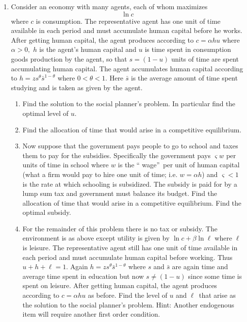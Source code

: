 \documentclass{article}
\begin{document}
\begin{enumerate}
\item Consider an economy with many agents, each of whom maximizes 
\begin{equation*}
\ln c
\end{equation*}%
where $c$ is consumption. The representative agent has one unit of time
available in each period and must accumulate human capital before he works.
After getting human capital, the agent produces according to $c=\alpha hu$
where $\alpha >0,$ $h$ is the agent's human capital and $u$ is time spent in
consumption goods production by the agent, so that $s=\left( 1-u\right) $
units of time are spent accumulating human capital. The agent accumulates
human capital according to $h=zs^{\theta }\bar{s}^{1-\theta }$ where $%
0<\theta <1.$ Here $\bar{s}$ is the average amount of time spent studying
and is taken as given by the agent.

\begin{enumerate}
\item Find the solution to the social planner's problem. In particular find
the optimal level of $u$.

\item Find the allocation of time that would arise in a competitive
equilibrium.

\item Now suppose that the government pays people to go to school and taxes
them to pay for the subsidies. Specifically the government pays $\varsigma w$
per units of time in school where $w$ is the \textquotedblleft
wage\textquotedblright\ per unit of human capital (what a firm would pay to
hire one unit of time; i.e. $w=\alpha h$) and $\varsigma <1$ is the rate at
which schooling is subsidized$.$ The subsidy is paid for by a lump sum tax
and government must balance its budget. Find the allocation of time that
would arise in a competitive equilibrium. Find the optimal subsidy.

\item For the remainder of this problem there is no tax or subsidy. The
environment is as above except utility is given by $\ln c+\beta \ln \ell $
where $\ell $ is leisure. The representative agent still has one unit of
time available in each period and must accumulate human capital before
working. Thus $u+h+\ell =1.$ Again $h=zs^{\theta }\bar{s}^{1-\theta }$ where 
$s$ and $\bar{s}$ are again time and average time spent in education but now 
$s\neq (1-u)$ since some time is spent on leisure. After getting human
capital, the agent produces according to $c=\alpha hu$ as before. Find the
level of $u$ and $\ell $\ that arise as the solution to the social planner's
problem. Hint: Another endogenous item will require another first order
condition. \pagebreak
\end{enumerate}
\end{enumerate}
\end{document}
